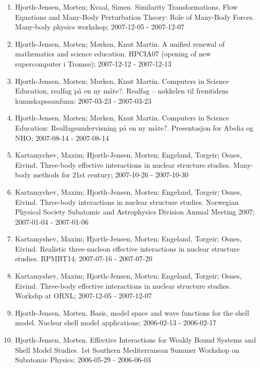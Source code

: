 \documentclass[%
oneside,                 %
final,                   %
10pt]{article}
\begin{document}
\begin{enumerate}
\item Hjorth-Jensen, Morten; Kvaal, Simen. Similarity Transformations, Flow Equations and Many-Body Perturbation Theory: Role of Many-Body Forces. Many-body physics workshop; 2007-12-05 - 2007-12-07

\item Hjorth-Jensen, Morten; M\o rken, Knut Martin.  A uniﬁed renewal of mathematics and science education. HPCIA07 (opening of new supercomputer i Tromsø); 2007-12-12 - 2007-12-13

\item Hjorth-Jensen, Morten; M\o rken, Knut Martin. Computers in Science Education, realfag på en ny måte?. Realfag – nøkkelen til fremtidens kunnskapssamfunn; 2007-03-23 - 2007-03-23

\item Hjorth-Jensen, Morten; M\o rken, Knut Martin.  Computers in Science Education: Realfagsundervisning på en ny måte?. Presentasjon for Abelia og NHO; 2007-08-14 - 2007-08-14

\item Kartamychev, Maxim; Hjorth-Jensen, Morten; Engeland, Torgeir; Osnes, Eivind.  Three-body effective interactions in nuclear structure studies. Many-body methods for 21st century; 2007-10-26 - 2007-10-30

\item Kartamychev, Maxim; Hjorth-Jensen, Morten; Engeland, Torgeir; Osnes, Eivind.  Three-body interactions in nuclear structure studies. Norwegian Physical Society Subatomic and Astrophysics Division Annual Meeting 2007; 2007-01-04 - 2007-01-06

\item Kartamyshev, Maxim; Hjorth-Jensen, Morten; Engeland, Torgeir; Osnes, Eivind.  Realistic three-nucleon effective interactions in nuclear structure studies. RPMBT14; 2007-07-16 - 2007-07-20

\item Kartamyshev, Maxim; Hjorth-Jensen, Morten; Engeland, Torgeir; Osnes, Eivind.  Three-body effective interactions in nuclear structure studies. Workshp at ORNL; 2007-12-05 - 2007-12-07

\item Hjorth-Jensen, Morten.  Basis, model space and wave functions for the shell model. Nuclear shell model applications; 2006-02-13 - 2006-02-17

\item Hjorth-Jensen, Morten.  Effective Interactions for Weakly Bound Systems and Shell Model Studies. 1st Southern Mediterranean Summer Workshop on Subatomic Physics; 2006-05-29 - 2006-06-03


\end{enumerate}
\end{document}
